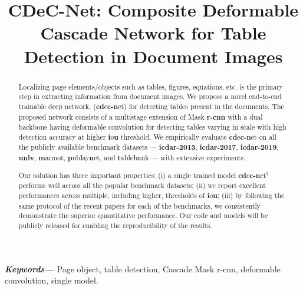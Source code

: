 \documentclass[a4paper,conference]{IEEEtran}
\providecommand{\keywords}[1]
{
 \small	
 \textbf{\textit{Keywords---}} #1
}
\begin{document}
\title{CDeC-Net: Composite Deformable Cascade Network for Table Detection in Document Images}

\author{
\and
{}
\and
{}
}
\maketitle

\begin{abstract}
Localizing page elements/objects such as tables, figures, equations, etc. is the primary step in extracting information from document images. We propose a novel end-to-end trainable deep network, ({\sc \textbf{cd}}e{\sc \textbf{c-n}}et) for detecting tables present in the documents. The proposed network consists of a multistage extension of Mask {\sc \textbf{r-cnn}} with a dual backbone having deformable convolution for detecting tables varying in scale with high detection accuracy at higher {\sc \textbf{i}}o{\sc \textbf{u}} threshold. We empirically evaluate {\sc \textbf{cd}}e{\sc \textbf{c-n}}et on all the publicly available benchmark datasets --- {\sc \textbf{icdar-2013}}, {\sc \textbf{icdar-2017}}, {\sc \textbf{icdar-2019}}, {\sc \textbf{unlv}}, {\sc \textbf{m}}armot, {\sc \textbf{p}}ub{\sc \textbf{l}}ay{\sc \textbf{n}}et, and {\sc \textbf{t}}able{\sc \textbf{b}}ank --- with extensive experiments.

Our solution has three important properties: (i) a single trained model {\sc \textbf{cd}}e{\sc \textbf{c-n}}et$^{\ddagger}$ performs well across all the popular benchmark datasets; (ii) we report excellent performances across multiple, including higher, thresholds of {\sc \textbf{i}}o{\sc \textbf{u}}; (iii) by following the same protocol of the recent papers for each of the benchmarks, we consistently demonstrate the superior quantitative performance. Our code and models will be publicly released for enabling the reproducibility of the results.

\end{abstract}

\keywords{Page object, table detection, Cascade Mask {\sc r-cnn}, deformable convolution, single model.}
\end{document}
